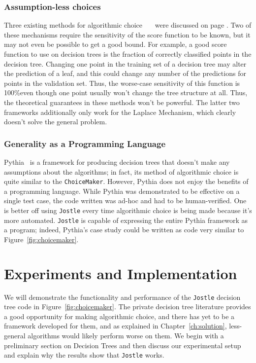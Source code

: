 \documentclass[11pt]{report}
\newcommand{\Jostle}{\texttt{Jostle}}
\renewcommand{\t}[1]{\texttt{#1}}
\begin{document}
\subsection{Assumption-less choices}
Three existing methods for algorithmic choice~\cite{Chaudhuri:2013}~\cite{Ligett:2017}~\cite{Kotsogiannis:2017} were discussed on page \pageref{sec:algchoice}. Two of these mechanisms require the sensitivity of the score function to be known, but it may not even be possible to get a good bound. For example, a good score function to use on decision trees is the fraction of correctly classified points in the decision tree. Changing one point in the training set of a decision tree may alter the prediction of a leaf, and this could change any number of the predictions for points in the validation set. Thus, the worse-case sensitivity of this function is 100\%even though one point usually won't change the tree structure at all. Thus, the theoretical guarantees in these methods won't be powerful. The latter two frameworks additionally only work for the Laplace Mechanism, which clearly doesn't solve the general problem.

\subsection{Generality as a Programming Language}
Pythia~\cite{Kotsogiannis:2017} is a framework for producing decision trees that doesn't make any assumptions about the algorithms; in fact, its method of algorithmic choice is quite similar to the \t{ChoiceMaker}. However, Pythia does not enjoy the benefits of a programming language. While Pythia was demonstrated to be effective on a single test case, the code written was ad-hoc and had to be human-verified. One is better off using \Jostle{} every time algorithmic choice is being made because it's more automated. \Jostle{} is capable of expressing the entire Pythia framework as a program; indeed, Pythia's case study could be written as code very similar to Figure~\ref{fig:choicemaker}.

\chapter{Experiments and Implementation}\label{ch:experiments}
We will demonstrate the functionality and performance of the \Jostle{} decision tree code in Figure~\ref{fig:choicemaker}. The private decision tree literature provides a good opportunity for making algorithmic choice, and there has yet to be a framework developed for them, and as explained in Chapter~\ref{ch:solution}, less-general algorithms would likely perform worse on them. We begin with a preliminary section on Decision Trees and then discuss our experimental setup and explain why the results show that \Jostle{} works.
\end{document}
